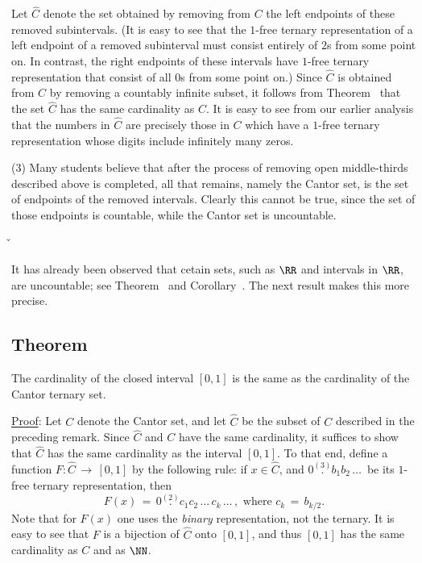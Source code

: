 {        Let $\hat{C}$ denote the set obtained by removing from $C$ the left endpoints of these removed subintervals.
    (It is easy to see that the $1$-free ternary representation of a left endpoint of a removed subinterval must consist entirely of $2$s from some point on.
    In contrast, the right endpoints of these intervals have $1$-free ternary representation that consist of all $0$s from some point on.)
    Since $\hat{C}$ is obtained from $C$ by removing a countably infinite subset, it follows from Theorem~ that the set $\hat{C}$ has the same cardinality as $C$.
    It is easy to see from our earlier analysis that the numbers in $\hat{C}$ are precisely those in $C$ which have a $1$-free ternary representation whose digits include infinitely many zeros.

\V

        (3) Many students believe that after the process of removing open middle-thirds described above is completed,
    all that remains, namely the Cantor set, is the set of endpoints of the removed intervals.
    Clearly this cannot be true, since the set of those endpoints is countable, while the Cantor set is uncountable.

\v
\V

        It has already been observed that cetain sets, such as ${\RR}$ and intervals in ${\RR}$, are uncountable; see Theorem~ and Corollary~.
    The next result makes this more precise.

\V

            \subsection{\small{\bf Theorem}}
            \label{ThmA20.130}

        The cardinality of the closed interval $[0,1]$ is the same as the cardinality of the Cantor ternary set.


\V

        \underline{Proof}: Let $C$ denote the Cantor set, and let $\hat{C}$ be the subset of $C$ described in the preceding remark.
    Since $\hat{C}$ and $C$ have the same cardinality, it suffices to show that $\hat{C}$ has the same cardinality as the interval $[0,1]$.
    To that end, define a function $F:\hat{C} \,{\rightarrow}\, [0,1]$ by the following rule:
    if $x{\in}\hat{C}$, and $0\stackrel{(3)}{.}b_{1}b_{2}\,{\ldots}\, $ be its $1$-free ternary representation, then
        \begin{displaymath}
        F(x) \,=\, 0 \stackrel{(2)}{.}c_{1}c_{2}\,{\ldots}\, c_{k}\,{\ldots}\,, \mbox{ where $c_{k} \,=\, b_{k/2}$}.
        \end{displaymath}
    Note that for $F(x)$ one uses the {\em binary} representation, not the ternary.
    It is easy to see that $F$ is a bijection of $\hat{C}$ onto $[0,1]$, and thus $[0,1]$ has the same cardinality as $C$ and as ${\cal {\NN}}$.


}
